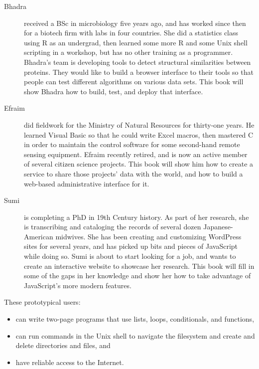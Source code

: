 \begin{description}

\item[Bhadra]
received a BSc in microbiology five years ago,
and has worked since then for a biotech firm with labs in four countries.
She did a statistics class using R as an undergrad,
then learned some more R and some Unix shell scripting
in a  workshop,
but has no other training as a programmer.
Bhadra's team is developing tools
to detect structural similarities between proteins.
They would like to build a browser interface to their tools
so that people can test different algorithms on various data sets.
This book will show Bhadra how to build, test, and deploy that interface.

\item[Efraim]
did fieldwork for the Ministry of Natural Resources for thirty-one years.
He learned Visual Basic so that he could write Excel macros,
then mastered C in order to maintain the control software
for some second-hand remote sensing equipment.
Efraim recently retired,
and is now an active member of several citizen science projects.
This book will show him how to create a service
to share those projects' data with the world,
and how to build a web-based administrative interface for it.

\item[Sumi]
is completing a PhD in 19th Century history.
As part of her research,
she is transcribing and cataloging the records of several dozen Japanese-American midwives.
She has been creating and customizing WordPress sites for several years,
and has picked up bits and pieces of JavaScript while doing so.
Sumi is about to start looking for a job,
and wants to create an interactive website to showcase her research.
This book will fill in some of the gaps in her knowledge
and show her how to take advantage of JavaScript's more modern features.

\end{description}

These prototypical users:

\begin{itemize}
\item
  can write two-page programs that use lists, loops, conditionals, and functions,
\item
  can run commands in the Unix shell to navigate the filesystem and create and delete directories and files, and
\item
  have reliable access to the Internet.
\end{itemize}

